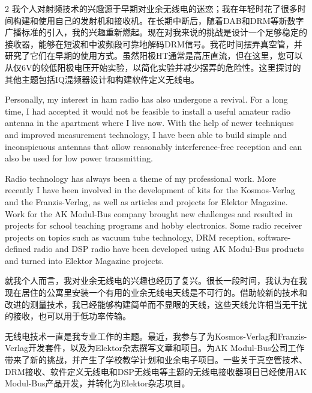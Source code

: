 \documentclass{ctexbook}
\begin{document}
\begin{paracol}{2}
我个人对射频技术的兴趣源于早期对业余无线电的迷恋；我在年轻时花了很多时间构建和使用自己的发射机和接收机。在长期中断后，随着DAB和DRM等新数字广播标准的引入，我的兴趣重新燃起。现在对我来说的挑战是设计一个足够稳定的接收器，能够在短波和中波频段可靠地解码DRM信号。我花时间摆弄真空管，并研究了它们在早期的使用方式。虽然阳极HT通常是高压直流，但在这里，您可以从仅6V的较低阳极电压开始实验，以简化实验并减少摆弄的危险性。这里探讨的其他主题包括IQ混频器设计和构建软件定义无线电。

\switchcolumn*

Personally, my interest in ham radio has also undergone a revival. For a long time, I had 
accepted it would not be feasible to install a useful amateur radio antenna in the apartment 
where I live now. With the help of newer techniques and improved measurement technology, I have been able to build simple and inconspicuous antennas that allow reasonably 
interference-free reception and can also be used for low power transmitting.

Radio technology has always been a theme of my professional work. More recently I have 
been involved in the development of kits for the Kosmos-Verlag and the Franzis-Verlag, 
as well as articles and projects for Elektor Magazine. Work for the AK Modul-Bus company 
brought new challenges and resulted in projects for school teaching programs and hobby 
electronics. Some radio receiver projects on topics such as vacuum tube technology, DRM 
reception, software-defined radio and DSP radio have been developed using AK Modul-Bus 
products and turned into Elektor Magazine projects.

\switchcolumn

就我个人而言，我对业余无线电的兴趣也经历了复兴。很长一段时间，我认为在我现在居住的公寓里安装一个有用的业余无线电天线是不可行的。借助较新的技术和改进的测量技术，我已经能够构建简单而不显眼的天线，这些天线允许相当无干扰的接收，也可以用于低功率传输。

无线电技术一直是我专业工作的主题。最近，我参与了为Kosmos-Verlag和Franzis-Verlag开发套件，以及为Elektor杂志撰写文章和项目。为AK Modul-Bus公司工作带来了新的挑战，并产生了学校教学计划和业余电子项目。一些关于真空管技术、DRM接收、软件定义无线电和DSP无线电等主题的无线电接收器项目已经使用AK Modul-Bus产品开发，并转化为Elektor杂志项目。

\end{paracol}
\end{document}
